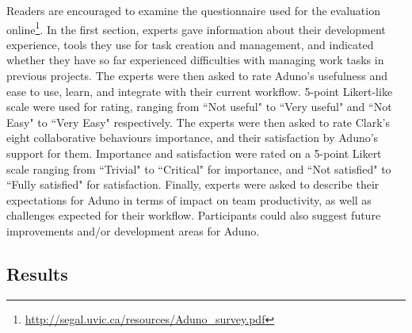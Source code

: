 \documentclass[conference]{IEEEtran}
\begin{document}
Readers are encouraged to examine the questionnaire used for the evaluation online\footnote{\url{http://segal.uvic.ca/resources/Aduno_survey.pdf}}. In the first section, experts gave information about their development experience, tools they use for task creation and management, and indicated whether they have so far experienced difficulties with managing work tasks in previous projects. The experts were then asked to rate Aduno's usefulness and ease to use, learn, and integrate with their current workflow. 5-point Likert-like scale were used for rating, ranging from ``Not useful" to ``Very useful" and ``Not Easy" to ``Very Easy" respectively. The experts were then asked to rate Clark's~\cite{Clark96} eight collaborative behaviours importance, and their satisfaction by Aduno's support for them. Importance and satisfaction were rated on a 5-point Likert scale ranging from ``Trivial" to ``Critical" for importance, and ``Not satisfied" to ``Fully satisfied" for satisfaction. Finally, experts were asked to describe their expectations for Aduno in terms of impact on team productivity, as well as challenges expected for their workflow. Participants could also suggest future improvements and/or development areas for Aduno.


\subsection{Results}
\end{document}
